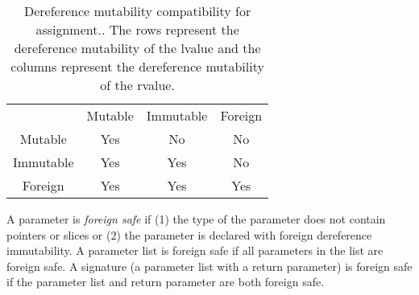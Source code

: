 
\begin{table}
  \centering
  \begin{tabular}{cccc}
              & Mutable & Immutable & Foreign \\
    Mutable   & Yes     & No        & No      \\
    Immutable & Yes     & Yes       & No      \\
    Foreign   & Yes     & Yes       & Yes     \\
    \end{tabular}
  \caption{Dereference mutability compatibility for assignment.\label{assignmut}.  The rows represent the dereference mutability of the lvalue and the columns represent the dereference mutability of the rvalue.}
\end{table}

A parameter is \emph{foreign safe} if (1) the type of the parameter does not contain pointers or slices or (2) the parameter is declared with foreign dereference immutability.
A parameter list is foreign safe if all parameters in the list are foreign safe.
A signature (a parameter list with a return parameter) is foreign safe if the parameter list and return parameter are both foreign safe.


